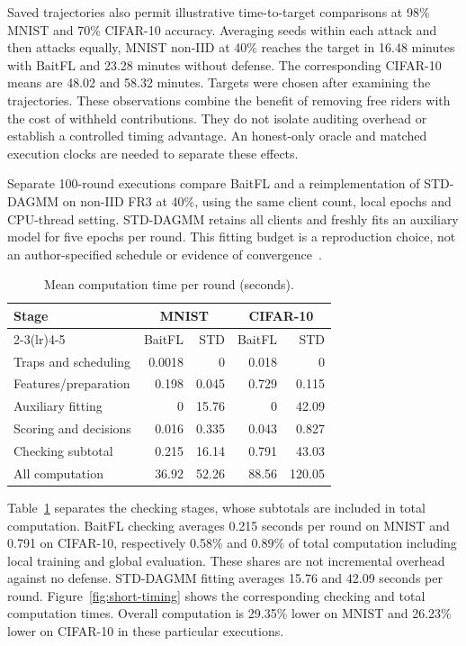 \documentclass[conference]{IEEEtran}
\makeatletter
\renewcommand{\subsection}{\@startsection{subsection}{2}{\z@}{1.5ex}{0.7ex}{\normalfont\normalsize\itshape}}
\makeatother
\begin{document}
Saved trajectories also permit illustrative time-to-target comparisons
at 98\% MNIST and 70\% CIFAR-10 accuracy. Averaging seeds within each
attack and then attacks equally, MNIST non-IID at 40\% reaches the target
in 16.48 minutes with BaitFL and 23.28 minutes without defense. The
corresponding CIFAR-10 means are 48.02 and 58.32 minutes. Targets were
chosen after examining the trajectories. These observations combine the
benefit of removing free riders with the cost of withheld contributions.
They do not isolate auditing overhead or establish a controlled timing
advantage. An honest-only oracle and matched execution clocks are needed
to separate these effects.

\subsection{Instrumented Computation Cost}
Separate 100-round executions compare BaitFL and a reimplementation of
STD-DAGMM on non-IID FR3 at 40\%, using the same client count, local
epochs and CPU-thread setting. STD-DAGMM retains all clients and freshly
fits an auxiliary model for five epochs per round. This fitting budget
is a reproduction choice, not an author-specified schedule or evidence
of convergence~\cite{lin2019freeriders,zong2018dagmm}.

\begin{table}[t]
\centering\footnotesize\setlength{\tabcolsep}{4pt}
\caption{Mean computation time per round (seconds).}\label{tab:short-timing}
\begin{tabular}{lrrrr}\toprule
\multirow{2}{*}{Stage}&\multicolumn{2}{c}{MNIST}&\multicolumn{2}{c}{CIFAR-10}\\
\cmidrule(lr){2-3}\cmidrule(lr){4-5}
&BaitFL&STD&BaitFL&STD\\\midrule
Traps and scheduling&0.0018&0&0.018&0\\
Features/preparation&0.198&0.045&0.729&0.115\\
Auxiliary fitting&0&15.76&0&42.09\\
Scoring and decisions&0.016&0.335&0.043&0.827\\\midrule
Checking subtotal&0.215&16.14&0.791&43.03\\
All computation&36.92&52.26&88.56&120.05\\\bottomrule
\end{tabular}
\end{table}

Table~\ref{tab:short-timing} separates the checking stages, whose
subtotals are included in total computation. BaitFL checking averages
0.215 seconds per round on MNIST and 0.791 on CIFAR-10, respectively
0.58\% and 0.89\% of total computation including local training and
global evaluation. These shares are not incremental overhead against
no defense. STD-DAGMM fitting averages 15.76 and 42.09 seconds per round.
Figure~\ref{fig:short-timing} shows the corresponding checking and total
computation times. Overall computation is 29.35\% lower on MNIST and
26.23\% lower on CIFAR-10 in these particular executions.
\end{document}
